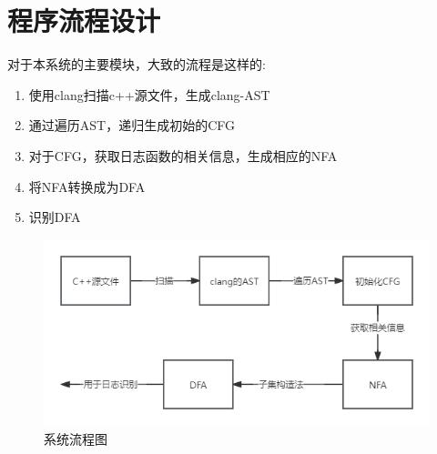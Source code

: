 \section{程序流程设计}
对于本系统的主要模块，大致的流程是这样的:
\begin{enumerate}
	\item 使用clang扫描c++源文件，生成clang-AST
    \item 通过遍历AST，递归生成初始的CFG
    \item 对于CFG，获取日志函数的相关信息，生成相应的NFA
    \item 将NFA转换成为DFA
    \item 识别DFA
\end{enumerate}
\begin{figure}[htbp]
	\centering
	\includegraphics[width=1\textwidth]{pictures/系统流程.png}
	\caption{系统流程图}
	\label{fig:系统流程图}
\end{figure}

